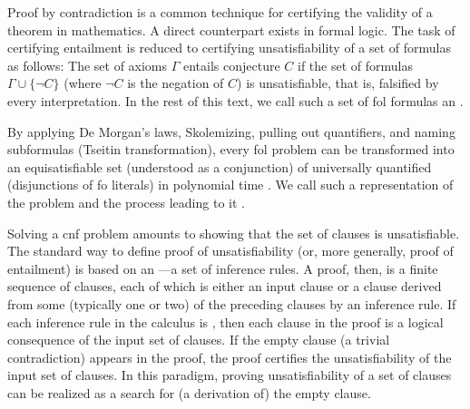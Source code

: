 Proof by contradiction is a common technique for certifying the validity of a theorem in mathematics.
A direct counterpart exists in formal logic.
The task of certifying
entailment is reduced to
certifying
unsatisfiability of a set of formulas as follows:
The set of axioms $\Gamma$ entails conjecture $C$ if the set of formulas $\Gamma \cup \{\lnot C\}$ (where $\lnot C$ is the negation of $C$) is unsatisfiable, that is, falsified by every interpretation.
In the rest of this text, we call such a set of \gls{fol} formulas an .


By applying
De Morgan's laws,
Skolemizing,
pulling out quantifiers, and
naming subformulas (Tseitin transformation),
every \gls{fol} problem can be transformed into an equisatisfiable set (understood as a conjunction) of universally quantified  (disjunctions of \gls{fo} literals) in polynomial time \cite{DBLP:books/el/RV01/NonnengartW01}.
We call such a representation of the problem 
and the process leading to it .

Solving a \gls{cnf} problem amounts to showing that the set of clauses is unsatisfiable.
The standard way to define proof of unsatisfiability (or, more generally, proof of entailment) is based on an ---a set of inference rules.
A proof, then, is a finite sequence of clauses,
each of which is either an input clause or a clause derived from some (typically one or two) of the preceding clauses by an inference rule.
If each inference rule in the calculus is ,
then each clause in the proof is a logical consequence of the input set of clauses.
If the empty clause (a trivial contradiction) appears in the proof,
the proof certifies the unsatisfiability of the input set of clauses.
In this paradigm, proving unsatisfiability of a set of clauses can be realized as a search for (a derivation of) the empty clause.

